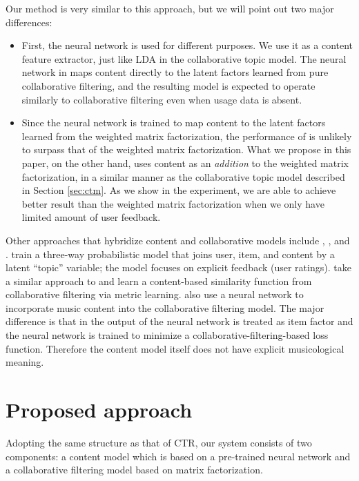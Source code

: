 Our method is very similar to this approach, but we will point out two major differences:
\begin{itemize}
\item First, the neural network is used for different purposes. We use it as a content feature extractor, just like LDA in the collaborative topic model. The neural network in \cite{van2013deep} maps content directly to the latent factors learned from pure collaborative filtering, and the resulting model is expected to operate similarly to collaborative filtering even when usage data is absent.

\item Since the neural network is trained to map content to the latent factors learned from the weighted matrix factorization, the performance of \cite{van2013deep} is unlikely to surpass that of the weighted matrix factorization. What we propose in this paper, on the other hand, uses content as an \emph{addition} to the weighted matrix factorization, in a similar manner as the collaborative topic model described in Section \ref{sec:ctm}. As we show in the experiment, we are able to achieve better result than the weighted matrix factorization when we only have limited amount of user feedback.  
\end{itemize}

Other approaches that hybridize content and collaborative models include \citet{yoshii2006hybrid}, \citet{mcfee2010learning}, and \citet{wang2014improving}. \citet{yoshii2006hybrid} train a three-way probabilistic model that joins user, item, and content by a latent ``topic'' variable; the model focuses on explicit feedback (user ratings). \cite{mcfee2010learning} take a similar approach to \cite{van2013deep} and learn a content-based similarity function from collaborative filtering via metric learning. \cite{wang2014improving} also use a neural network to incorporate music content into the collaborative filtering model. The major difference is that in \cite{wang2014improving} the output of the neural network is treated as item factor and the neural network is trained to minimize a collaborative-filtering-based loss function. Therefore the content model itself does not have explicit musicological meaning. 


\section{Proposed approach} 
Adopting the same structure as that of CTR, our system consists of two components: a content model which is based on a pre-trained neural network and a collaborative filtering model based on matrix factorization. 

